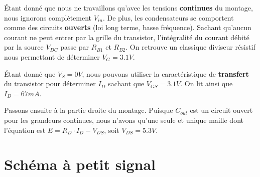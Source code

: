 \documentclass{../template/tp}
\begin{document}
	{%
	Étant donné que nous ne travaillons qu'avec les tensions \textbf{continues} du montage, nous ignorons complètement $V_{in}$.
	De plus, les condensateurs se comportent comme des circuits \textbf{ouverts} (loi long terme, basse fréquence).
	Sachant qu'aucun courant ne peut entrer par la grille du transistor, l'intégralité du courant débité par la source $V_{DC}$ passe par $R_{B1}$ et $R_{B2}$.
	On retrouve un classique diviseur résistif nous permettant de déterminer $V_G = 3.1 V$.

	Étant donné que $V_S = 0 V$, nous pouvons utiliser la caractéristique de \textbf{transfert} du transistor pour déterminer $I_D$ sachant que $V_{GS} = 3.1 V$. On lit ainsi que $I_D = 67 mA$.

	Passons ensuite à la partie droite du montage.
	Puisque $C_{out}$ est un circuit ouvert pour les grandeurs continues, nous n'avons qu'une seule et unique maille dont l'équation est $E = R_D \cdot I_D - V_{DS}$, soit $V_{DS} = 5.3 V$.

	
	}


\section{Schéma à petit signal}
\end{document}
